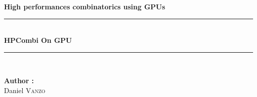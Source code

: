 
\let\cleardoublepage\clearpage

\begin{titlepage}
\begin{center}

\vspace{2\baselineskip}
\textbf{High performances combinatorics using GPUs}\\[0.5cm]


\rule{\linewidth}{0.5mm} \\[0.4cm]
{ \huge \bfseries HPCombi On GPU \\[0.4cm] }
\rule{\linewidth}{0.5mm} \\[1.5cm]

\noindent
\begin{minipage}{0.4\textwidth}
  \begin{flushleft} \large
    \textbf{Author :}\\
    Daniel \textsc{Vanzo}\\    
  \end{flushleft}
\end{minipage}%

\begin{minipage}{0.4\textwidth}
  \begin{flushright} \large
  \end{flushright}
\end{minipage}

\vspace{3\baselineskip}


\vfill



\end{center}
\end{titlepage}
